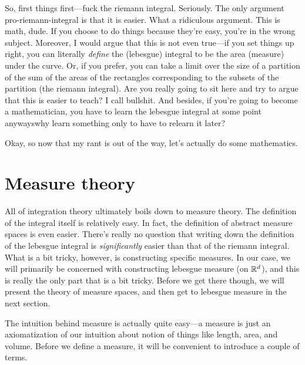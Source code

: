 So, first things first---fuck the riemann integral.  Seriously.  The only argument pro-riemann-integral is that it is easier.  What a ridiculous argument.  This is math, dude.  If you choose to do things because they're easy, you're in the wrong subject.  Moreover, I would argue that this is not even true---if you set things up right, you can literally \emph{define} the (lebesgue) integral to be the area (measure) under the curve.  Or, if you prefer, you can take a limit over the size of a partition of the sum of the areas of the rectangles corresponding to the subsets of the partition (the riemann integral).  Are you really going to sit here and try to argue that this is easier to teach?  I call bullshit.  And besides, if you're going to become a mathematician, you have to learn the lebesgue integral at some point anyways\textellipsis why learn something only to have to relearn it later?

Okay, so now that my rant is out of the way, let's actually do some mathematics.

\section{Measure theory}

All of integration theory ultimately boils down to measure theory.  The definition of the integral itself is relatively easy.  In fact, the definition of abstract measure spaces is even easier.  There's really no question that writing down the definition of the lebesgue integral is \emph{significantly} easier than that of the riemann integral.  What is a bit tricky, however, is constructing specific measures.  In our case, we will primarily be concerned with constructing lebesgue measure (on $\mathbb{R} ^d$), and this is really the only part that is a bit tricky.  Before we get there though, we will present the theory of measure spaces, and then get to lebesgue measure in the next section.

The intuition behind measure is actually quite easy---a measure is just an axiomatization of our intuition about notion of things like length, area, and volume.  Before we define a measure, it will be convenient to introduce a couple of terms.

